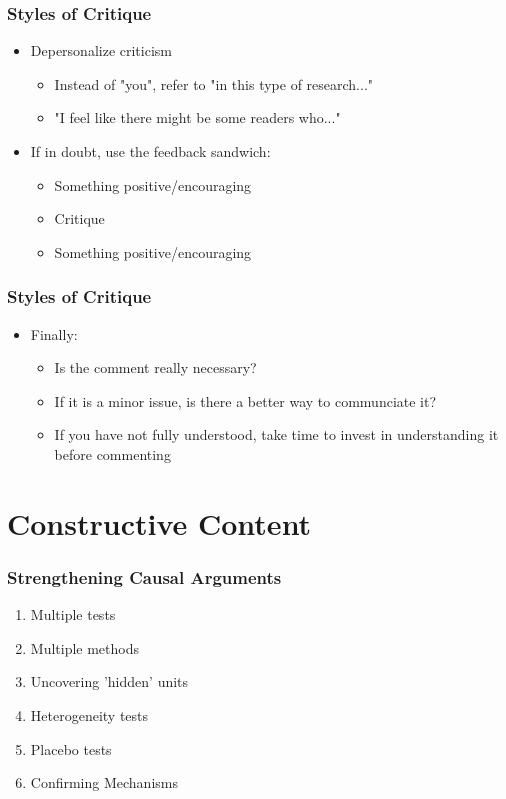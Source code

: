 \documentclass[xcolor=x11names,compress]{beamer}\usepackage[]{graphicx}\usepackage[]{color}
\renewcommand{\(}{\begin{columns}}
\renewcommand{\)}{\end{columns}}
\newcommand{\<}[1]{\begin{column}{#1}}
\renewcommand{\>}{\end{column}}
\begin{document}
\begin{frame}
\frametitle{Styles of Critique}
\begin{itemize}
\item Depersonalize criticism
\begin{itemize}
\item Instead of "you", refer to "in this type of research..."
\item "I feel like there might be some readers who..."
\end{itemize}
\item If in doubt, use the feedback sandwich:
\begin{itemize}
\item Something positive/encouraging
\item Critique
\item Something positive/encouraging
\end{itemize}
\end{itemize}
\end{frame}

\begin{frame}
\frametitle{Styles of Critique}
\begin{itemize}
\item Finally:
\begin{itemize}
\item Is the comment really necessary?
\item If it is a minor issue, is there a better way to communciate it?
\item If you have not fully understood, take time to invest in understanding it before commenting
\end{itemize}
\end{itemize}
\end{frame}

\section{Constructive Content}

\begin{frame}
\frametitle{Strengthening Causal Arguments}
\begin{enumerate}
\item Multiple tests
\item Multiple methods
\item Uncovering 'hidden' units
\item Heterogeneity tests
\item Placebo tests
\item Confirming Mechanisms
\end{enumerate}
\end{frame}
\end{document}
